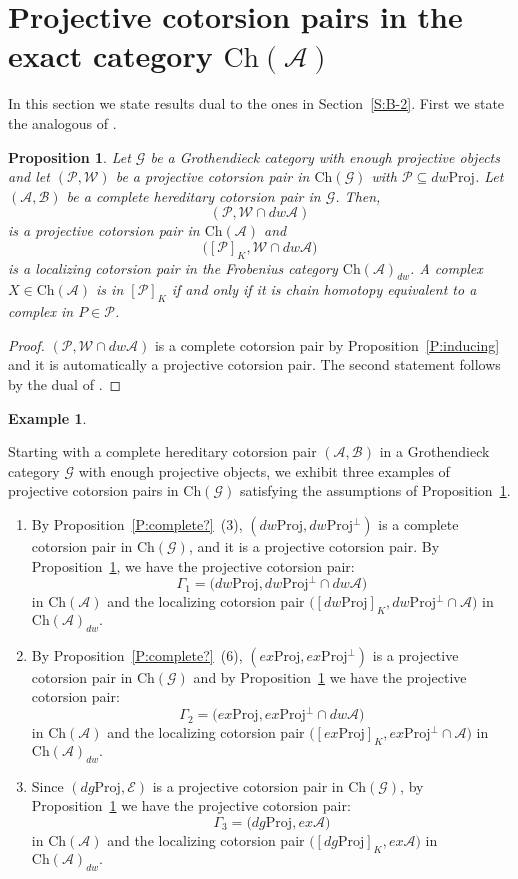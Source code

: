 \documentclass[11pt,a4paper,reqno]{amsart}
\newcommand{\A}{\mathcal{A}}
\newcommand{\B}{\mathcal{B}}
\newcommand{\E}{\mathcal{E}}
\newcommand{\G}{\mathcal{G}}
\newcommand{\clP}{\mathcal{P}}
\newcommand{\W}{\mathcal{W}}
\newcommand{\Ch}{\mathrm{Ch}}
\newcommand{\Proj}{\mathrm{Proj}}
\theoremstyle{plain}
\newtheorem{prop}[thm]{Proposition}
\theoremstyle{definition}
\newtheorem{expl}[thm]{Example}
\theoremstyle{remark}
\begin{document}
  \section{Projective cotorsion pairs in the exact category $\Ch(\A)$}
   In this section we state results dual to the ones in Section~\ref{S:B-2}.
 First we state the analogous of \cite[Proposition 7.2 ]{G7}.

 \begin{prop}\label{P:7.2-Groth} Let $\G$ be a Grothendieck category with enough projective objects and let $(\clP, \W)$ be a projective cotorsion pair in $\Ch(\G)$ with $\clP\subseteq dw\Proj$.
 Let $(\A, \B)$ be a complete hereditary cotorsion pair in $\G$. Then,
 \[(\clP, \W\cap dw\A)\] is a projective cotorsion pair in $\Ch(\A)$ and \[\Big([\clP]_K, \W\cap dw \A\Big)\] is a localizing cotorsion pair in the Frobenius category $\Ch(\A)_{dw}$. A complex $X\in \Ch(\A)$ is in $[\clP]_K$ if and only if it is chain homotopy equivalent to a complex in $P\in \clP$.
 \end{prop}
 \begin{proof} $(\clP, \W\cap dw\A)$ is a complete cotorsion pair by Proposition~\ref{P:inducing} and it is automatically a projective cotorsion pair. The second statement follows by the dual of \cite[Theorem 6.3, Proposition 6.4]{G7}.
\end{proof}
\begin{expl}\label{E:exam-A-proj}

Starting with a complete hereditary cotorsion pair $(\A, \B)$ in a Grothendieck  category $\G$ with enough projective objects, we exhibit three examples of projective cotorsion pairs in $\Ch(\G)$ satisfying the assumptions of Proposition~\ref{P:7.2-Groth}.

%
 \begin{enumerate}
\item  By Proposition~\ref{P:complete?}~(3), $(dw\Proj, dw \Proj{}^\perp{})$ is a complete cotorsion pair  in $\Ch(\G)$, and it is a projective cotorsion pair. By Proposition~\ref{P:7.2-Groth},  we have the projective cotorsion pair:
 \[\Gamma_1=\Big(dw\Proj, dw \Proj{}^\perp{}\cap dw\A\Big)\] in $\Ch(\A)$ and the localizing cotorsion pair $\Big([dw\Proj]_K, dw \Proj{}^\perp{}\cap\A\Big)$ in $\Ch(\A)_{dw}.$
 \item By Proposition~\ref{P:complete?}~(6), $(ex\Proj, ex\Proj{}^\perp{})$ is a projective cotorsion pair in $\Ch(\G)$ and by Proposition~\ref{P:7.2-Groth} we have the projective cotorsion pair:
  \[\Gamma_2=\Big(ex\Proj, ex \Proj{}^\perp{}\cap dw\A\Big)\] in $\Ch(\A)$ and the localizing cotorsion pair $\Big([ex\Proj]_K, ex \Proj{}^\perp{}\cap\A\Big)$ in $\Ch(\A)_{dw}.$
  \item Since $(dg\Proj, \E )$ is a projective cotorsion pair in $\Ch(\G)$, by Proposition~\ref{P:7.2-Groth} we have the projective cotorsion pair:
  \[\Gamma_3=\Big(dg\Proj, ex\A\Big)\]  in $\Ch(\A)$ and the localizing cotorsion pair $\Big([dg\Proj]_K, ex\A\Big)$ in $\Ch(\A)_{dw}.$
\end{enumerate}
\end{expl}
\end{document}
